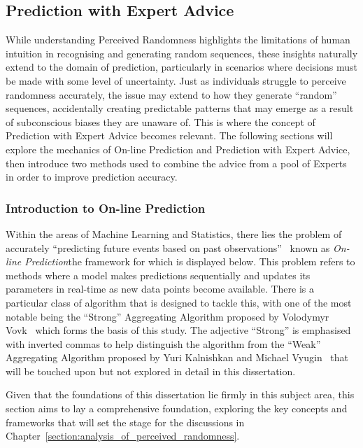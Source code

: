 \subsection{Prediction with Expert Advice}\label{section:prediction_with_expert_advice}
While understanding Perceived Randomness highlights the limitations of human intuition in recognising and generating random sequences, these insights naturally extend to the domain of prediction, particularly in scenarios where decisions must be made with some level of uncertainty. Just as individuals struggle to perceive randomness accurately, the issue may extend to how they generate ``random'' sequences, accidentally creating predictable patterns that may emerge as a result of subconscious biases they are unaware of. This is where the concept of Prediction with Expert Advice becomes relevant. The following sections will explore the mechanics of On-line Prediction and Prediction with Expert Advice, then introduce two methods used to combine the advice from a pool of Experts in order to improve prediction accuracy.

\subsubsection{Introduction to On-line Prediction}
Within the areas of Machine Learning and Statistics, there lies the problem of accurately ``predicting future events based on past observations''~\cite{cesa-bianchi:1997}  known as \textit{On-line Prediction}\textemdash{}the framework for which is displayed below. This problem refers to methods where a model makes predictions sequentially and updates its parameters in real-time as new data points become available. There is a particular class of algorithm that is designed to tackle this, with one of the most notable being the ``Strong'' Aggregating Algorithm proposed by Volodymyr Vovk~\cite{vovk:1990} which forms the basis of this study. The adjective ``Strong'' is emphasised with inverted commas to help distinguish the algorithm from the ``Weak'' Aggregating Algorithm proposed by Yuri Kalnishkan and Michael Vyugin~\cite{kalnishkan/vyugin:2008} that will be touched upon but not explored in detail in this dissertation.

Given that the foundations of this dissertation lie firmly in this subject area, this section aims to lay a comprehensive foundation, exploring the key concepts and frameworks that will set the stage for the discussions in Chapter~\ref{section:analysis_of_perceived_randomness}.

